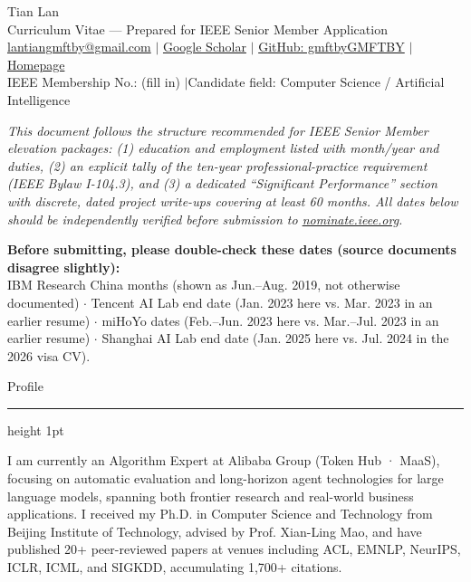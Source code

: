 \documentclass[10.5pt]{article}
\newcommand{\cvsection}[1]{%
  \vspace{10pt}
  {\color{accent}\headingfont\Large #1}\par
  \vspace{2pt}
  {\color{accent}\hrule height 1pt}
  \vspace{6pt}
}
\begin{document}
\begin{center}
  {\headingfont\fontsize{20}{24}\selectfont Tian Lan} \\[3pt]
  {\color{muted}\small Curriculum Vitae --- Prepared for IEEE Senior Member Application}\\[4pt]
  {\small
    \href{mailto:lantiangmftby@gmail.com}{lantiangmftby@gmail.com} \quad$\vert$\quad
    \href{https://scholar.google.com/citations?user=B0W47gsAAAAJ&hl=zh-CN}{Google Scholar} \quad$\vert$\quad
    \href{https://github.com/gmftbyGMFTBY}{GitHub: gmftbyGMFTBY} \quad$\vert$\quad
    \href{https://lantiangmftby.github.io/}{Homepage}
  }\\[2pt]
  {\small\color{muted} IEEE Membership No.: \underline{\hspace{3.2cm}} (fill in) \quad$\vert$\quad Candidate field: Computer Science / Artificial Intelligence}
\end{center}

\vspace{4pt}
{\small\color{muted}\itshape
This document follows the structure recommended for IEEE Senior Member elevation packages: (1) education and employment listed with month/year and duties, (2) an explicit tally of the ten-year professional-practice requirement (IEEE Bylaw I-104.3), and (3) a dedicated ``Significant Performance'' section with discrete, dated project write-ups covering at least 60 months. All dates below should be independently verified before submission to \href{https://nominate.ieee.org}{nominate.ieee.org}.
}

\vspace{6pt}
{\small\color{accent}\bfseries Before submitting, please double-check these dates (source documents disagree slightly):}\\
{\small\color{muted}
IBM Research China months (shown as Jun.--Aug. 2019, not otherwise documented) $\cdot$
Tencent AI Lab end date (Jan. 2023 here vs. Mar. 2023 in an earlier resume) $\cdot$
miHoYo dates (Feb.--Jun. 2023 here vs. Mar.--Jul. 2023 in an earlier resume) $\cdot$
Shanghai AI Lab end date (Jan. 2025 here vs. Jul. 2024 in the 2026 visa CV).
}

\cvsection{Profile}
I am currently an Algorithm Expert at Alibaba Group (Token Hub · MaaS), focusing on automatic evaluation and long-horizon agent technologies for large language models, spanning both frontier research and real-world business applications. I received my Ph.D. in Computer Science and Technology from Beijing Institute of Technology, advised by Prof. Xian-Ling Mao, and have published 20+ peer-reviewed papers at venues including ACL, EMNLP, NeurIPS, ICLR, ICML, and SIGKDD, accumulating 1{,}700+ citations.
\end{document}
